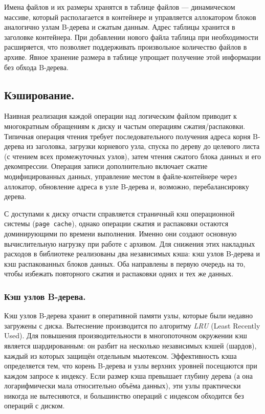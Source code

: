 Имена файлов и их размеры хранятся в таблице файлов --- динамическом массиве, который располагается в контейнере и управляется аллокатором блоков аналогично узлам B-дерева и сжатым данным. Адрес таблицы хранится в заголовке контейнера. При добавлении нового файла таблица при необходимости расширяется, что позволяет поддерживать произвольное количество файлов в архиве. Явное хранение размера в таблице упрощает получение этой информации без обхода B-дерева.

\subsection{Кэширование.}

Наивная реализация каждой операции над логическим файлом приводит к многократным обращениям к диску и частым операциям сжатия/распаковки. Типичная операция чтения требует последовательного получения адреса корня B-дерева из заголовка, загрузки корневого узла, спуска по дереву до целевого листа (с чтением всех промежуточных узлов), затем чтения сжатого блока данных и его декомпрессии. Операция записи дополнительно включает сжатие модифицированных данных, управление местом в файле-контейнере через аллокатор, обновление адреса в узле B-дерева и, возможно, перебалансировку дерева.

С доступами к диску отчасти справляется страничный кэш операционной системы (\texttt{page cache}), однако операции сжатия и распаковки остаются доминирующими по времени выполнения. Именно они создают основную вычислительную нагрузку при работе с архивом. Для снижения этих накладных расходов в библиотеке реализованы два независимых кэша: кэш узлов B-дерева и кэш распакованных блоков данных. Оба направлены в первую очередь на то, чтобы избежать повторного сжатия и распаковки одних и тех же данных.

\subsubsection{Кэш узлов B-дерева.}

Кэш узлов B-дерева хранит в оперативной памяти узлы, которые были недавно загружены с диска. Вытеснение производится по алгоритму \textit{LRU} (Least Recently Used). Для повышения производительности в многопоточном окружении кэш является шардированным: он разбит на несколько независимых кэшей (шардов), каждый из которых защищён отдельным мьютексом. Эффективность кэша определяется тем, что корень B-дерева и узлы верхних уровней посещаются при каждом запросе к индексу. Если размер кэша превышает глубину дерева (а она логарифмически мала относительно объёма данных), эти узлы практически никогда не вытесняются, и большинство операций с индексом обходится без операций с диском.

